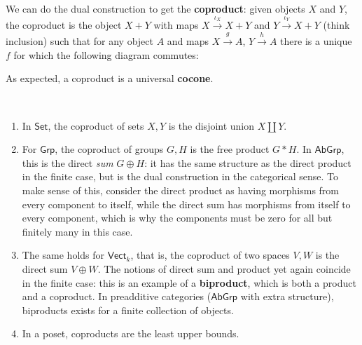 \begin{definition}[Coproduct]
We can do the dual construction to get the \textbf{coproduct}: given objects $X$ and $Y$, the coproduct is the object $X+Y$ with maps $X\overset{\iota_X}{\to } X+Y$ and $Y\overset{\iota_Y}{\to } X+Y$ (think inclusion) such that for any object $A$ and maps $X\overset{g}{\to } A$, $Y\overset{h}{\to } A$ there is a unique $f$ for which the following diagram commutes:
\begin{figure}[H]
\centering
{}
\end{figure}
As expected, a coproduct is a universal \textbf{cocone}.
\end{definition}
\begin{example}
    \,
    \begin{enumerate}[label=(\alph*)]
        \item In $\mathsf{Set} $, the coproduct of sets $X,Y$ is the disjoint union $X\amalg Y$.
        \item For $\mathsf{Grp} $, the coproduct of groups $G,H$ is the free product $G*H$. In $\mathsf{AbGrp} $, this is the direct \emph{sum} $G\oplus H$: it has the same structure as the direct product in the finite case, but is the dual construction in the categorical sense. To make sense of this, consider the direct product as having morphisms from every component to itself, while the direct sum has morphisms from itself to every component, which is why the components must be zero for all but finitely many in this case. 
        \item The same holds for $\mathsf{Vect} _k$, that is, the coproduct of two spaces $V,W$ is the direct sum $V\oplus W$. The notions of direct sum and product yet again coincide in the finite case: this is an example of a \textbf{biproduct}, which is both a product and a coproduct. In preadditive categories ($\mathsf{AbGrp} $ with extra structure), biproducts exists for a finite collection of objects.
        \item In a poset, coproducts are the least upper bounds.
    \end{enumerate}
\end{example}
